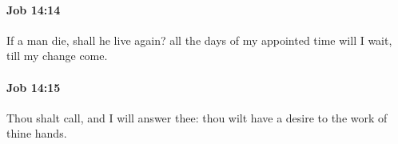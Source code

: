 		\paragraph{Job 14:14} %
			\label{JOB-14-14}

			If a man die, shall he live again? all the days of my appointed time will I wait, till my change come.


		\paragraph{Job 14:15} %
			\label{JOB-14-15}

			Thou shalt call, and I will answer thee: thou wilt have a desire to the work of thine hands.



